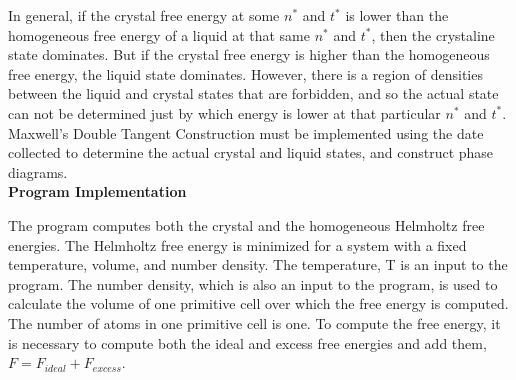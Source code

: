 \documentclass[double,12pt]{beavtex}
\begin{document}
In general, if the crystal free energy at some $n^*$ and $t^*$ is lower than the homogeneous free energy of a liquid at that same $n^*$ and $t^*$, then the crystaline state dominates. But if the crystal free energy is higher than the homogeneous free energy, the liquid state dominates. However, there is a region of densities between the liquid and crystal states that are forbidden, and so the actual state can not be determined just by which energy is lower at that particular $n^*$ and $t^*$. Maxwell's Double Tangent Construction must be implemented using the date collected to determine the actual crystal and liquid states, and construct phase diagrams. 
\[{}\]
\textbf{Program Implementation}

The program computes both the crystal and the homogeneous Helmholtz free energies. The Helmholtz free energy is minimized for a system with a fixed temperature, volume, and number density. The temperature, T is an input to the program. The number density, which is also an input to the program, is used to calculate the volume of one primitive cell over which the free energy is computed. The number of atoms in one primitive cell is one. To compute the free energy, it is necessary to compute both the ideal and excess free energies and add them, $F = F_{ideal} + F_{excess}$.
\end{document}

